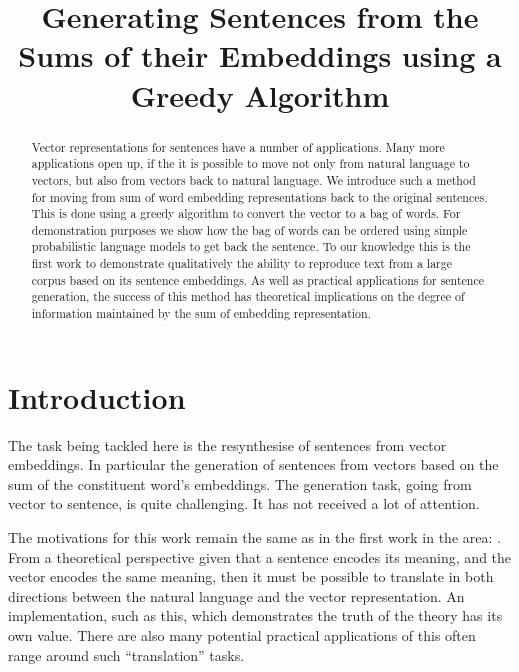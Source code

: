 \documentclass[11pt]{article}
\title{Generating Sentences from the Sums of their Embeddings using a Greedy Algorithm}
\author{}
\theoremstyle{plain}
\theoremstyle{definition}
\begin{document}
\maketitle

\begin{abstract}
Vector representations for sentences have a number of applications.
Many more applications open up, if the it is possible to move not only from natural language to vectors, but also from vectors back to natural language. We introduce such a method for moving from sum of word embedding representations back to the original sentences. This is done using a greedy algorithm to convert the vector to a bag of words. For demonstration purposes we show how the bag of words can be ordered using simple probabilistic language models to get back the sentence. To our knowledge this is the first work to demonstrate qualitatively the ability to reproduce text from a large corpus based on its sentence embeddings. 
As well as practical applications for sentence generation, the success of this method has theoretical implications on the degree of information maintained by the sum of embedding representation.

\end{abstract}

\section{Introduction} \label{intro}


The task being tackled here is the resynthesise of sentences from vector embeddings. In particular the generation of sentences from vectors based on the sum of the constituent word's embeddings. The generation task, going from vector to sentence, is quite challenging. It has not received a lot of attention.

The motivations for this work remain the same as in the first work in the area: \textcite{Dinu2014CompositionalGeneration}. From a theoretical perspective given that a sentence encodes its meaning, and the vector encodes the same meaning, then it must be possible to translate in both directions between the natural language and the vector representation. An implementation, such as this, which demonstrates the truth of the theory has its own value. There are also many potential practical applications of this often range around such ``translation'' tasks.
\end{document}
